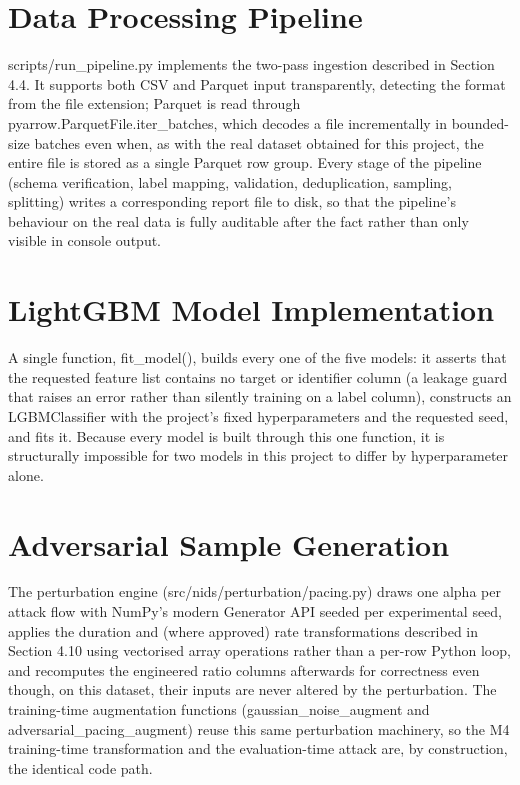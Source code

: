 \documentclass[12pt,a4paper]{report}
\begin{document}
\section{Data Processing Pipeline}
scripts/run\_pipeline.py implements the two-pass ingestion described in Section 4.4. It supports both CSV and Parquet input transparently, detecting the format from the file extension; Parquet is read through pyarrow.ParquetFile.iter\_batches, which decodes a file incrementally in bounded-size batches even when, as with the real dataset obtained for this project, the entire file is stored as a single Parquet row group. Every stage of the pipeline (schema verification, label mapping, validation, deduplication, sampling, splitting) writes a corresponding report file to disk, so that the pipeline's behaviour on the real data is fully auditable after the fact rather than only visible in console output.

\section{LightGBM Model Implementation}
A single function, fit\_model(), builds every one of the five models: it asserts that the requested feature list contains no target or identifier column (a leakage guard that raises an error rather than silently training on a label column), constructs an LGBMClassifier with the project's fixed hyperparameters and the requested seed, and fits it. Because every model is built through this one function, it is structurally impossible for two models in this project to differ by hyperparameter alone.

\section{Adversarial Sample Generation}
The perturbation engine (src/nids/perturbation/pacing.py) draws one alpha per attack flow with NumPy's modern Generator API seeded per experimental seed, applies the duration and (where approved) rate transformations described in Section 4.10 using vectorised array operations rather than a per-row Python loop, and recomputes the engineered ratio columns afterwards for correctness even though, on this dataset, their inputs are never altered by the perturbation. The training-time augmentation functions (gaussian\_noise\_augment and adversarial\_pacing\_augment) reuse this same perturbation machinery, so the M4 training-time transformation and the evaluation-time attack are, by construction, the identical code path.
\end{document}
